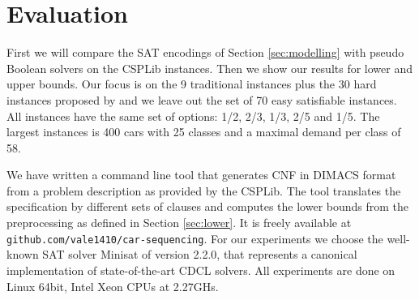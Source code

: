 \documentclass[]{easychair}
\begin{document}

\section{Evaluation}
\label{sec:experiments}
                                                                      
First we will compare the SAT encodings of Section \ref{sec:modelling} with pseudo Boolean solvers on the CSPLib
instances. Then we show our results for lower and upper bounds. Our focus is on the 9 traditional instances plus the 30
hard instances proposed by \cite{Gravel05} and we leave out the set of 70 easy satisfiable instances. All instances have
the same set of options: 1/2, 2/3, 1/3, 2/5 and 1/5. The largest instances is 400 cars with 25 classes and a maximal demand
per class of 58. 

We have written a command line tool that generates CNF in DIMACS format from a problem description as provided by the
CSPLib. The tool translates the specification by different sets of clauses and computes the lower bounds from the
preprocessing as defined in Section \ref{sec:lower}. It is freely available at \verb+github.com/vale1410/car-sequencing+. For our experiments we choose the well-known SAT solver Minisat \cite{Een03}
of version 2.2.0, that represents a canonical implementation of state-of-the-art CDCL solvers. All experiments are done
on Linux 64bit, Intel Xeon CPUs at 2.27GHs. 
\end{document}
